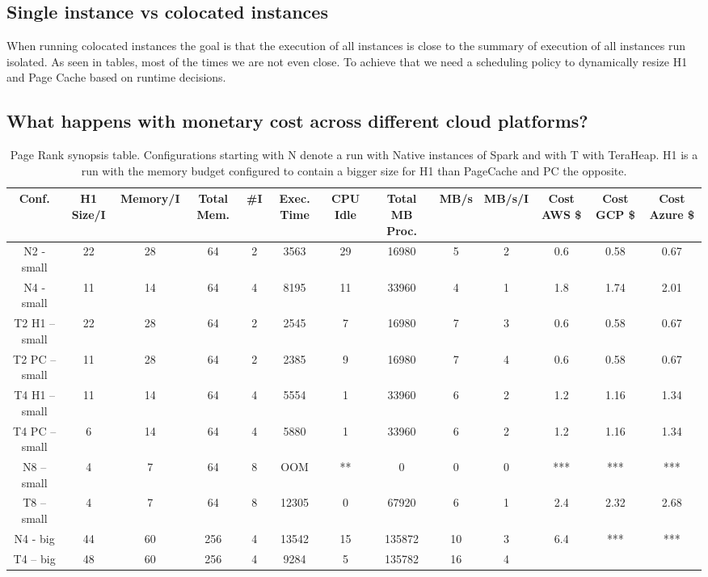 \subsection{Single instance vs colocated instances}
When running colocated instances the goal is that the execution 
of all instances is close to the summary of execution of all instances run isolated.
As seen in tables, most of the times we are not even close. To achieve that
we need a scheduling policy to dynamically resize H1 and Page Cache based on runtime decisions.

\subsection{What
happens with monetary cost across different cloud platforms?}

\iffalse
\begin{table}[htbp]
  \centering
	\begin{subtable}[b]{0.45\linewidth}
  \caption{Page Rank synopsis table. Configurations starting
    with N denote a run with Native instances of Spark and with T with
    TeraHeap. H1 is a run with the memory budget configured to contain
    a bigger size for H1 than PageCache and PC the opposite.}
  \label{tab:pr_table}
        \begin{tabular}{|c|c|c|c|c|c|c|c|c|c|c|c|c|}
      \hline
\textbf{Conf.} & \textbf{H1 Size/I} & \textbf{Memory/I} & \textbf{Total Mem.} & \textbf{\#I} & \textbf{Exec. Time} & \textbf{CPU Idle} & \textbf{Total MB Proc.} & \textbf{MB/s} & \textbf{MB/s/I} & \textbf{Cost AWS \$} & \textbf{Cost GCP \$} & \textbf{Cost Azure \$} \\
        \hline
    N2 - small & 22 & 28 & 64 & 2 & 3563 & 29 & 16980 & 5 & 2 & 0.6 & 0.58 & 0.67 \\
    N4 - small & 11 & 14 & 64 & 4 & 8195 & 11 & 33960 & 4 & 1 & 1.8 & 1.74 & 2.01 \\
    T2 H1 – small & 22 & 28 & 64 & 2 & 2545 & 7 & 16980 & 7 & 3 & 0.6 & 0.58 & 0.67 \\
    T2 PC – small & 11 & 28 & 64 & 2 & 2385 & 9 & 16980 & 7 & 4 & 0.6 & 0.58 & 0.67 \\
    T4 H1 – small & 11 & 14 & 64 & 4 & 5554 & 1 & 33960 & 6 & 2 & 1.2 & 1.16 & 1.34 \\
    T4 PC – small & 6 & 14 & 64 & 4 & 5880 & 1 & 33960 & 6 & 2 & 1.2 & 1.16 & 1.34 \\
    N8 – small & 4 & 7 & 64 & 8 & OOM & ** & 0 & 0 & 0 & *** & *** & *** \\
    T8 – small & 4 & 7 & 64 & 8 & 12305 & 0 & 67920 & 6 & 1 & 2.4 & 2.32 & 2.68 \\
    N4 - big & 44 & 60 & 256 & 4 & 13542 & 15 & 135872 & 10 & 3 & 6.4 & *** & *** \\
    T4 – big & 48 & 60 & 256 & 4 & 9284 & 5 & 135782 & 16 & 4 \\      
	\hline
     \end{tabular}%
\end{subtable}


\end{table}
